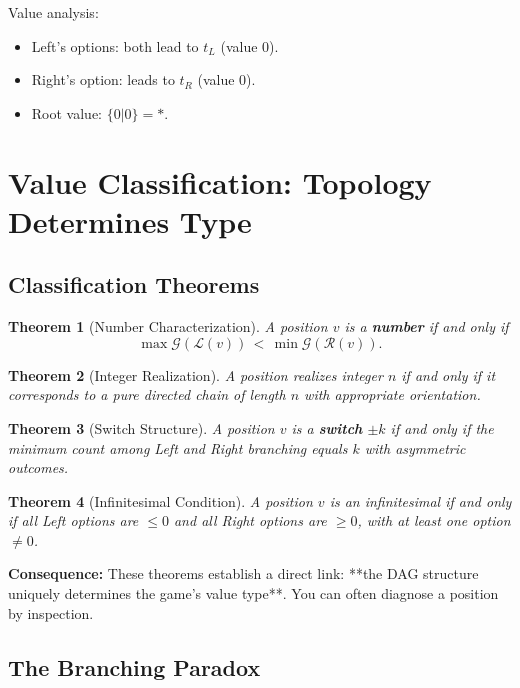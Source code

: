 \documentclass[10pt,a4paper,twocolumn]{article}
\newcommand{\Gv}[1]{\mathcal{G}(#1)}
\theoremstyle{plain}
\newtheorem{theorem}{Theorem}[section]
\theoremstyle{definition}
\theoremstyle{remark}
\begin{document}
Value analysis:
\begin{itemize}
\item Left's options: both lead to $t_L$ (value 0).
\item Right's option: leads to $t_R$ (value 0).
\item Root value: $\{0 | 0\} = *$.
\end{itemize}

\section{Value Classification: Topology Determines Type}

\subsection{Classification Theorems}

\begin{theorem}[Number Characterization]
A position $v$ is a \textbf{number} if and only if
\[
\max \Gv{\mathcal{L}(v)} \,<\, \min \Gv{\mathcal{R}(v)}.
\]
\end{theorem}

\begin{theorem}[Integer Realization]
A position realizes integer $n$ if and only if it corresponds to a pure directed chain of length $n$ with appropriate orientation.
\end{theorem}

\begin{theorem}[Switch Structure]
A position $v$ is a \textbf{switch} $\pm k$ if and only if the minimum count among Left and Right branching equals $k$ with asymmetric outcomes.
\end{theorem}

\begin{theorem}[Infinitesimal Condition]
A position $v$ is an infinitesimal if and only if all Left options are $\le 0$ and all Right options are $\ge 0$, with at least one option $\neq 0$.
\end{theorem}

\textbf{Consequence:} These theorems establish a direct link: **the DAG structure uniquely determines the game's value type**. You can often diagnose a position by inspection.

\subsection{The Branching Paradox}
\end{document}
